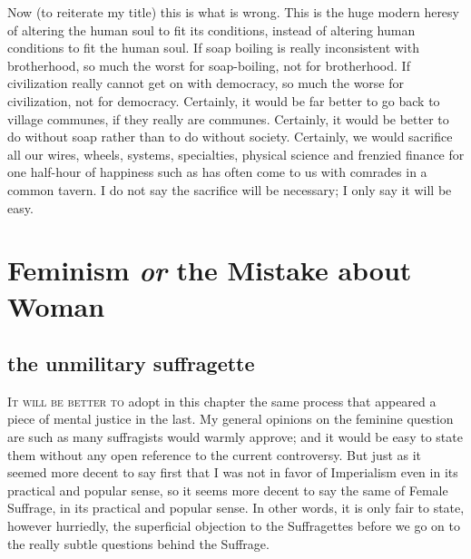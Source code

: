 \documentclass[final,10pt,letterpaper,twocolumn,openany]{book}
\newcommand{\dcap}[2]{
	 \lettrine[nindent=0em,findent=2pt,lines=3,loversize=.15,lraise=0]{#1}{#2}
 }
\begin{document}
Now (to reiterate my title) this is what is wrong. This is the huge
modern heresy of altering the human soul to fit its conditions, instead of
altering human conditions to fit the human soul. If soap boiling is really
inconsistent with brotherhood, so much the worst for soap-boiling, not for
brotherhood. If civilization really cannot get on with democracy, so much
the worse for civilization, not for democracy. Certainly, it would be far
better to go back to village communes, if they really are communes.
Certainly, it would be better to do without soap rather than to do without
society. Certainly, we would sacrifice all our wires, wheels, systems,
specialties, physical science and frenzied finance for one half-hour of
happiness such as has often come to us with comrades in a common tavern.
I do not say the sacrifice will be necessary; I only say it will be easy.

\chapter{ Feminism \textit{or} the Mistake about Woman }

\section{the unmilitary suffragette}

     \dcap{I}{t will be better to} adopt in this chapter the same process that appeared
a piece of mental justice in the last. My general opinions on the feminine
question are such as many suffragists would warmly approve; and it would
be easy to state them without any open reference to the current
controversy. But just as it seemed more decent to say first that I was not in
favor of Imperialism even in its practical and popular sense, so it seems
more decent to say the same of Female Suffrage, in its practical and
popular sense. In other words, it is only fair to state, however hurriedly,
the superficial objection to the Suffragettes before we go on to the really
subtle questions behind the Suffrage.
\end{document}
